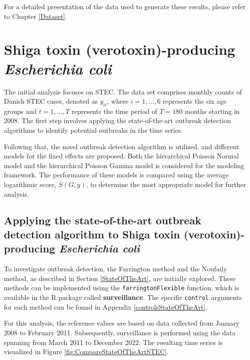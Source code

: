 \documentclass[a4paper,twoside,11pt]{report} %
\theoremstyle{definition}
\theoremstyle{definition}
\theoremstyle{definition}
\theoremstyle{definition}
\theoremstyle{remark}
\begin{document}
For a detailed presentation of the data used to generate these results, please refer to Chapter \ref{Dataset}.

\section{Shiga toxin (verotoxin)-producing \textit{Escherichia coli}}

The initial analysis focuses on STEC. The data set comprises monthly counts of Danish STEC cases, denoted as \(y_{it}\), where \(i=1,\dots,6\) represents the six age groups and \(t=1,\dots,T\) represents the time period of \(T=180\) months starting in 2008. The first step involves applying the state-of-the-art outbreak detection algorithms to identify potential outbreaks in the time series.

Following that, the novel outbreak detection algorithm is utilized, and different models for the fixed effects are proposed. Both the hierarchical Poisson Normal model and the hierarchical Poisson Gamma model is considered for the modeling framework. The performance of these models is compared using the average logarithmic score, \(\bar{S}(G,y)\), to determine the most appropriate model for further analysis.

\subsection{Applying the state-of-the-art outbreak detection algorithm to Shiga toxin (verotoxin)-producing \textit{Escherichia coli}}

To investigate outbreak detection, the Farrington method and the Noufaily method, as described in Section \ref{StateOfTheArt}, are initially explored. These methods can be implemented using the \texttt{farringtonFlexible} function, which is available in the R package called \textbf{surveillance}. The specific \texttt{control} arguments for each method can be found in Appendix \ref{controlsStateOfTheArt}.

For this analysis, the reference values are based on data collected from January 2008 to February 2011. Subsequently, surveillance is performed using the data spanning from March 2011 to December 2022. The resulting time series is visualized in Figure \ref{fig:CompareStateOfTheArtSTEC}.
\end{document}

